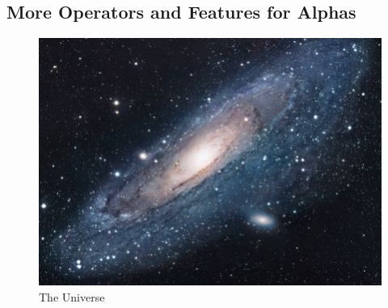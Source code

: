 \documentclass[a4paper,12pt]{report}
\numberwithin{equation}{section}
\theoremstyle{definition}
\begin{document}
\subsection{More Operators and Features for Alphas}


\begin{figure}[h!]
\centering
\includegraphics[scale=1.7]{universe}
\caption{The Universe}
\label{fig:universe}
\end{figure}





\end{document}
